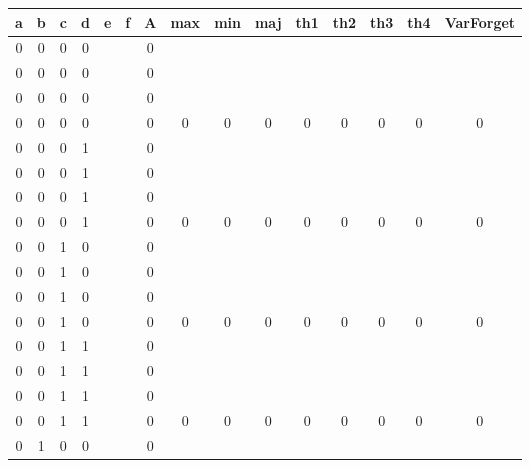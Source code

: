 \begin{table}[!tb]
    \centering
    \begin{tabular}{|c|c|c|c|c|c|c|c|c|c|c|c|c|c|c|}
        \hline
        \textbf{a} & \textbf{b} & \textbf{c} & \textbf{d} & \textbf{e} & \textbf{f} & \textbf{A} & \textbf{max} & \textbf{min} & \textbf{maj} & \textbf{th1} & \textbf{th2} & \textbf{th3} & \textbf{th4} & \textbf{VarForget} \\ \hline
        \rowcolor{gray!40} 0 & 0 & 0 & 0 &  &  & 0 &  &  &  &  &  &  &  &  \\ \hline
        \rowcolor{gray!40} 0 & 0 & 0 & 0 &  &  & 0 &  &  &  &  &  &  &  &  \\ \hline
        \rowcolor{gray!40} 0 & 0 & 0 & 0 &  &  & 0 &  &  &  &  &  &  &  &  \\ \hline
        \rowcolor{gray!40} 0 & 0 & 0 & 0 &  &  & 0 & 0 & 0 & 0 & 0 & 0 & 0 & 0 & 0 \\ \hline
        \rowcolor{blue!40} 0 & 0 & 0 & 1 &  &  & 0 &  &  &  &  &  &  &  &  \\ \hline
        \rowcolor{blue!40} 0 & 0 & 0 & 1 &  &  & 0 &  &  &  &  &  &  &  &  \\ \hline
        \rowcolor{blue!40} 0 & 0 & 0 & 1 &  &  & 0 &  &  &  &  &  &  &  &  \\ \hline
        \rowcolor{blue!40} 0 & 0 & 0 & 1 &  &  & 0 & 0 & 0 & 0 & 0 & 0 & 0 & 0 & 0 \\ \hline
        \rowcolor{red!40} 0 & 0 & 1 & 0 &  &  & 0 &  &  &  &  &  &  &  &  \\ \hline
        \rowcolor{red!40} 0 & 0 & 1 & 0 &  &  & 0 &  &  &  &  &  &  &  &  \\ \hline
        \rowcolor{red!40} 0 & 0 & 1 & 0 &  &  & 0 &  &  &  &  &  &  &  &  \\ \hline
        \rowcolor{red!40} 0 & 0 & 1 & 0 &  &  & 0 & 0 & 0 & 0 & 0 & 0 & 0 & 0 & 0 \\ \hline
        \rowcolor{green!40} 0 & 0 & 1 & 1 &  &  & 0 &  &  &  &  &  &  &  &  \\ \hline
        \rowcolor{green!40} 0 & 0 & 1 & 1 &  &  & 0 &  &  &  &  &  &  &  &  \\ \hline
        \rowcolor{green!40} 0 & 0 & 1 & 1 &  &  & 0 &  &  &  &  &  &  &  &  \\ \hline
        \rowcolor{green!40} 0 & 0 & 1 & 1 &  &  & 0 & 0 & 0 & 0 & 0 & 0 & 0 & 0 & 0 \\ \hline
        \rowcolor{yellow!40} 0 & 1 & 0 & 0 &  &  & 0 &  &  &  &  &  &  &  &  \\ \hline

\end{tabular}
\end{table}
